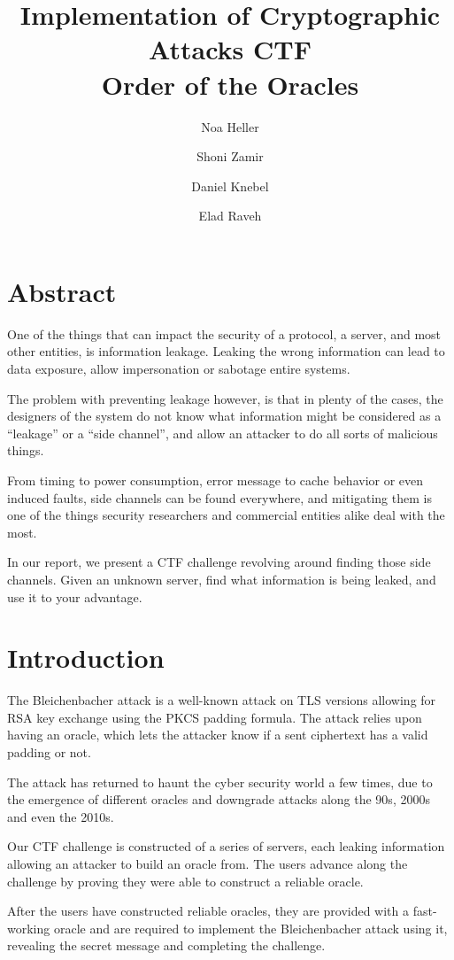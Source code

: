 \documentclass[sigconf]{acmart}
\title{Implementation of Cryptographic Attacks CTF \\ Order of the Oracles}
\author{Noa Heller \and Shoni Zamir \and Daniel Knebel \and Elad Raveh}
\begin{document}
\maketitle

\section*{Abstract}
One of the things that can impact the security of a protocol, a server, and most other entities, is information leakage. Leaking the wrong information can lead to data exposure, allow impersonation or sabotage entire systems.

The problem with preventing leakage however, is that in plenty of the cases, the designers of the system do not know what information might be considered as a “leakage” or a “side channel”, and allow an attacker to do all sorts of malicious things.

From timing to power consumption, error message to cache behavior or even induced faults, side channels can be found everywhere, and mitigating them is one of the things security researchers and commercial entities alike deal with the most.

In our report, we present a CTF challenge revolving around finding those side channels. Given an unknown server, find what information is being leaked, and use it to your advantage.

\section{Introduction}
The Bleichenbacher attack is a well-known attack on TLS versions allowing for RSA key exchange using the PKCS padding formula. The attack relies upon having an oracle, which lets the attacker know if a sent ciphertext has a valid padding or not.

The attack has returned to haunt the cyber security world a few times, due to the emergence of different oracles and downgrade attacks along the 90s, 2000s and even the 2010s.

Our CTF challenge is constructed of a series of servers, each leaking information allowing an attacker to build an oracle from. The users advance along the challenge by proving they were able to construct a reliable oracle.

After the users have constructed reliable oracles, they are provided with a fast-working oracle and are required to implement the Bleichenbacher attack using it, revealing the secret message and completing the challenge.
\end{document}
